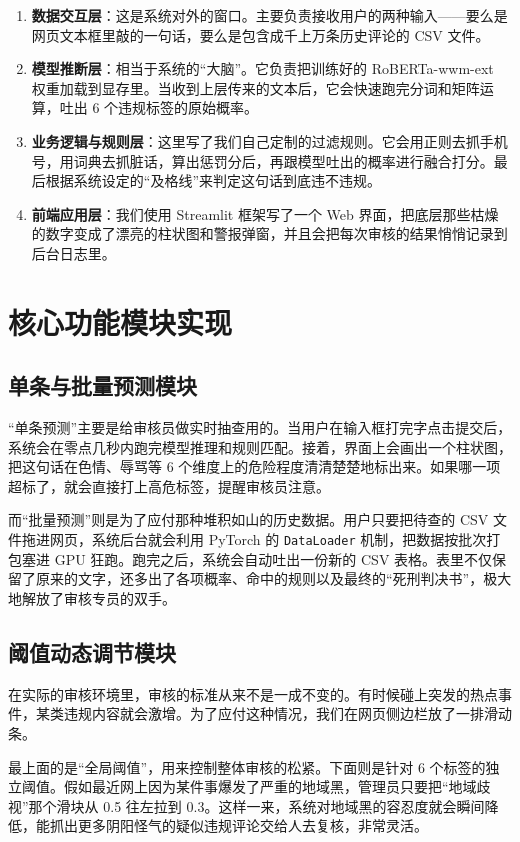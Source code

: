 \documentclass[twoside]{thesis-cls-Miya} %
\begin{document}
\begin{enumerate}
	\def\labelenumi{\arabic{enumi}.}
	\item
	\textbf{数据交互层}：这是系统对外的窗口。主要负责接收用户的两种输入——要么是网页文本框里敲的一句话，要么是包含成千上万条历史评论的 CSV 文件。
	\item
	\textbf{模型推断层}：相当于系统的“大脑”。它负责把训练好的 RoBERTa-wwm-ext 权重加载到显存里。当收到上层传来的文本后，它会快速跑完分词和矩阵运算，吐出 6 个违规标签的原始概率。
	\item
	\textbf{业务逻辑与规则层}：这里写了我们自己定制的过滤规则。它会用正则去抓手机号，用词典去抓脏话，算出惩罚分后，再跟模型吐出的概率进行融合打分。最后根据系统设定的“及格线”来判定这句话到底违不违规。
	\item
	\textbf{前端应用层}：我们使用 Streamlit 框架写了一个 Web 界面，把底层那些枯燥的数字变成了漂亮的柱状图和警报弹窗，并且会把每次审核的结果悄悄记录到后台日志里。
\end{enumerate}

\section{核心功能模块实现}
\subsection{单条与批量预测模块}
“单条预测”主要是给审核员做实时抽查用的。当用户在输入框打完字点击提交后，系统会在零点几秒内跑完模型推理和规则匹配。接着，界面上会画出一个柱状图，把这句话在色情、辱骂等 6 个维度上的危险程度清清楚楚地标出来。如果哪一项超标了，就会直接打上高危标签，提醒审核员注意。

而“批量预测”则是为了应付那种堆积如山的历史数据。用户只要把待查的 CSV 文件拖进网页，系统后台就会利用 PyTorch 的 \texttt{DataLoader} 机制，把数据按批次打包塞进 GPU 狂跑。跑完之后，系统会自动吐出一份新的 CSV 表格。表里不仅保留了原来的文字，还多出了各项概率、命中的规则以及最终的“死刑判决书”，极大地解放了审核专员的双手。

\subsection{阈值动态调节模块}
在实际的审核环境里，审核的标准从来不是一成不变的。有时候碰上突发的热点事件，某类违规内容就会激增。为了应付这种情况，我们在网页侧边栏放了一排滑动条。

最上面的是“全局阈值”，用来控制整体审核的松紧。下面则是针对 6 个标签的独立阈值。假如最近网上因为某件事爆发了严重的地域黑，管理员只要把“地域歧视”那个滑块从 0.5 往左拉到 0.3。这样一来，系统对地域黑的容忍度就会瞬间降低，能抓出更多阴阳怪气的疑似违规评论交给人去复核，非常灵活。
\end{document}
